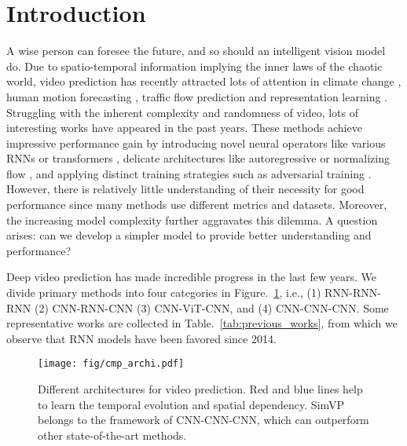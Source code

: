 \documentclass[10pt,twocolumn,letterpaper]{article}
\begin{document}
\section{Introduction}
\label{sec:intro}
A wise person can foresee the future, and so should an intelligent vision model do. Due to spatio-temporal information implying the inner laws of the chaotic world, video prediction has recently attracted lots of attention in climate change \cite{xingjian2015convolutional}, human motion forecasting \cite{babaeizadeh2017stochastic}, traffic flow prediction \cite{wang2019memory} and representation learning \cite{srivastava2015unsupervised}. Struggling with the inherent complexity and randomness of video, lots of interesting works have appeared in the past years. These methods achieve impressive performance gain by introducing novel neural operators like various RNNs \cite{xingjian2015convolutional,wang2019memory,wang2018eidetic,wang2017predrnn,wang2018predrnn++,wang2021predrnn} or transformers \cite{weissenborn2019scaling,rakhimov2020latent}, delicate architectures like autoregressive \cite{ranzato2014video, srivastava2015unsupervised, xingjian2015convolutional, kalchbrenner2017video, ho2019axial} or normalizing flow \cite{yu2019efficient}, and applying distinct training strategies such as adversarial training \cite{mathieu2015deep, saito2017temporal, tulyakov2018mocogan, vondrick2016generating, saito2018tganv2, luc2020transformation, clark2019adversarial, acharya2018towards}. However, there is relatively little understanding of their necessity for good performance since many methods use different metrics and datasets. Moreover, the increasing model complexity further aggravates this dilemma. A question arises: can we develop a simpler model to provide better understanding and performance?

Deep video prediction has made incredible progress in the last few years. We divide primary methods into four categories in Figure.~\ref{fig:cmp_archi}, i.e., (1) RNN-RNN-RNN (2) CNN-RNN-CNN (3) CNN-ViT-CNN, and (4) CNN-CNN-CNN. Some representative works are collected in Table.~\ref{tab:previous_works}, from which we observe that RNN models have been favored since 2014. 

\begin{figure}[h]
  \centering
      \texttt{[image: fig/cmp\_archi.pdf]}
    \caption{Different architectures for video prediction. Red and blue lines help to learn the temporal evolution and spatial dependency. SimVP belongs to the framework of CNN-CNN-CNN, which can outperform other state-of-the-art methods.}
    \label{fig:cmp_archi}
    \vspace{-2mm}
\end{figure}
\end{document}

